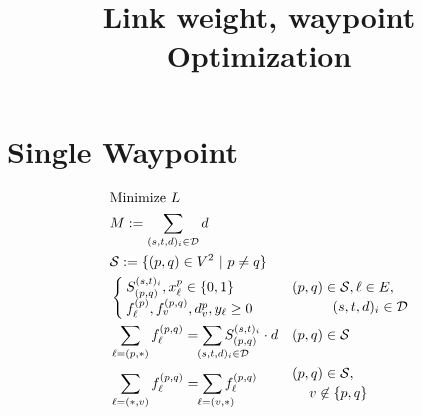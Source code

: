 \documentclass[a4paper,USenglish]{lipics-v2018}
\title{Link weight, waypoint Optimization}
\begin{document}
\maketitle

\section{Single Waypoint}

\begin{align}
& \text{Minimize} ~L \nonumber	&&\\
&M := \sum_{(s,t,d)_i \in \mathcal{D}} d &&
\\
&\mathcal{S} := \{(p,q) \in V^2 ~|~  p \neq q \}	&&
\\
&\begin{cases}
	S^{(s,t)_i}_{(p,q)}, x^{p}_{\ell} \in \{0,1\} \\	%
	f^{(p)}_{\ell}, f^{(p,q)}_{v}, d^{p}_v, y_{\ell}  \geq 0
\end{cases}
&&
\begin{multlined}
	  (p,q) \in \mathcal{S}, \ell \in E, \\
	   (s,t,d)_i \in \mathcal{D}
\end{multlined}	 \label{LP:vardef}    
\\
&\sum_{\ell = (p,*)} f^{(p,q)}_{\ell}  =
\sum_{\hspace{-5ex}\mathrlap{ (s,t,d)_i \in \mathcal{D}}} 
	S^{(s,t)_i}_{(p,q)} \cdot d 
&&	 (p,q) \in \mathcal{S}	\label{LP:flowWP}
\\
&\sum_{\ell = (*,v)} f^{(p,q)}_{\ell} =
	\sum_{\hspace{-5ex}\mathrlap{\ell= (v,*)} }f^{(p,q)}_{\ell} 
&&
\begin{multlined}
	(p,q) \in \mathcal{S}, \\
	 v \not\in \{p,q\}
\end{multlined} 	\label{LP:flowcons}
\\

\end{align}
\end{document}
